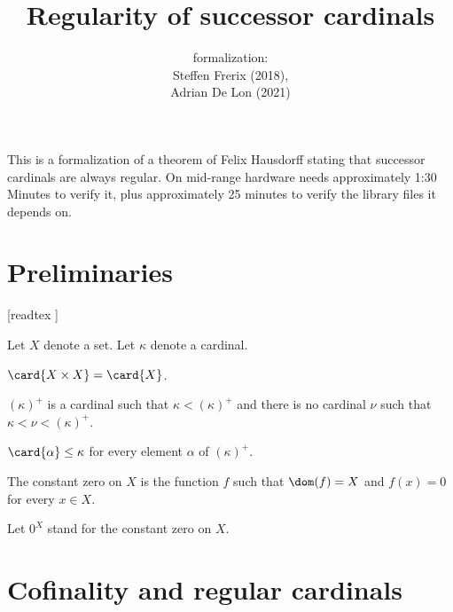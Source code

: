 \documentclass{stex}
\title{Regularity of successor cardinals}
\author{\Naproche formalization: \vspace{0.5em} \\
Steffen Frerix (2018), \\
Adrian De Lon (2021)}
\date{}
\newcommand{\constzero}[1]{0^{#1}}
\newcommand{\cardsucc}[1]{\left(#1\right)^{+}}
\begin{document}
  \maketitle

  \noindent This is a formalization of a theorem of Felix Hausdorff stating that
  successor cardinals are always regular.
  On mid-range hardware \Naproche needs approximately 1:30 Minutes to verify it,
  plus approximately 25 minutes to verify the library files it depends on.


  \section{Preliminaries}

  \begin{forthel}

    [readtex ]

  \end{forthel}

  \begin{forthel}
    Let $X$ denote a set.
    Let $\kappa$ denote a cardinal.

    \begin{axiom*}
      $\card{X \times X} = \card{X}$.
    \end{axiom*}

    \begin{signature*}
      $\cardsucc{\kappa}$ is a cardinal such that $\kappa \less \cardsucc{\kappa}$ and there is no
      cardinal $\nu$ such that $\kappa \less \nu \less \cardsucc{\kappa}$.
    \end{signature*}

    \begin{axiom*}
      $\card{\alpha} \leq \kappa$ for every element $\alpha$ of $\cardsucc{\kappa}$.
    \end{axiom*}

    \begin{definition*}
      The constant zero on $X$ is the function $f$ such that $\dom(f) = X$ and
      $f(x) = 0$ for every $x \in X$.
    \end{definition*}

    Let $\constzero{X}$ stand for the constant zero on $X$.
  \end{forthel}


  \section{Cofinality and regular cardinals}
\end{document}
